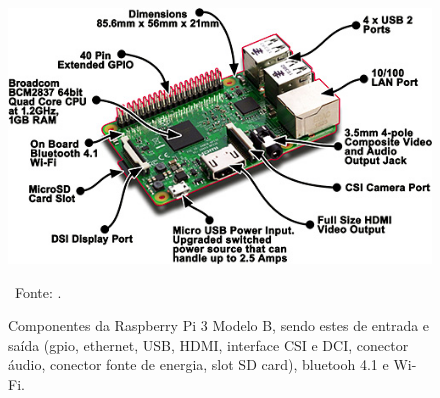 \begin{figure}[htb]  
	\centering
	\includegraphics[width=.8\textwidth]{figuras/ref_002}
	\caption[Raspberry Pi 3 Modelo B]{Componentes da Raspberry Pi 3 Modelo B, sendo estes de entrada e saída (gpio, ethernet, USB, HDMI, interface CSI e DCI, conector áudio, conector fonte de energia, slot SD card), bluetooh 4.1 e Wi-Fi.}
	\ Fonte: \cite{fundacaoraspberry:2017:raspberry}.
	\label{figura:ref_002}
\end{figure}

